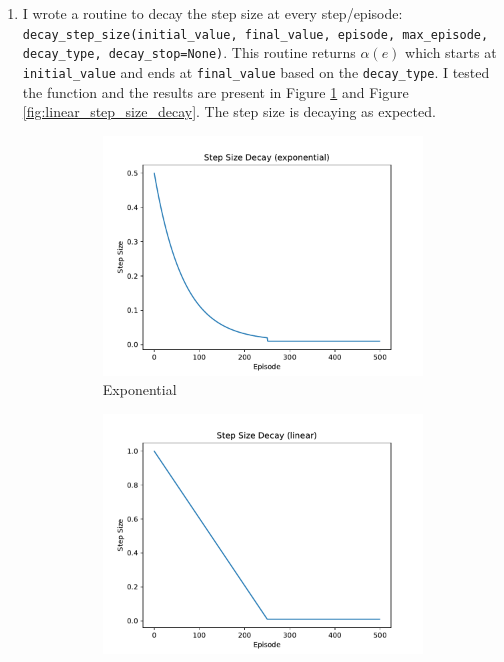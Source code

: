 \begin{enumerate}
    \item I wrote a routine to decay the step size at every step/episode: \texttt{decay\_step\_size(initial\_value, final\_value, episode, max\_episode, decay\_type, decay\_stop=None)}. This routine returns $\alpha(e)$ which starts at \texttt{initial\_value} and ends at \texttt{final\_value} based on the \texttt{decay\_type}. I tested the function and the results are present in Figure \ref{fig:exp_step_size_decay} and Figure \ref{fig:linear_step_size_decay}. The step size is decaying as expected.
    \begin{figure}[h]
        \centering
        \begin{subfigure}[b]{0.45\textwidth}
            \includegraphics[width=\textwidth]{images/mc_td/step_size_decay_exponential.pdf}
            \caption{Exponential}
            \label{fig:exp_step_size_decay}
        \end{subfigure}
        \begin{subfigure}[b]{0.45\textwidth}
            \includegraphics[width=\textwidth]{images/mc_td/step_size_decay_linear.pdf}

\end{subfigure}
\end{figure}
\end{enumerate}
